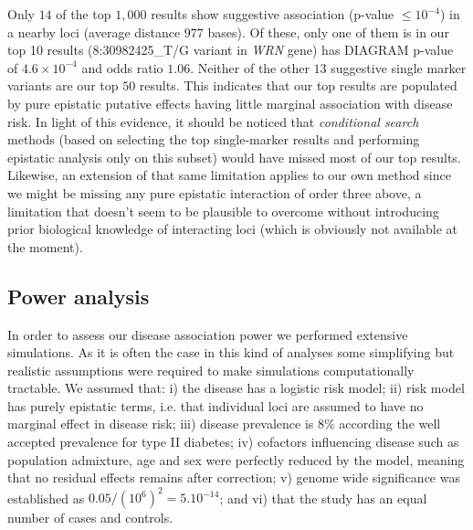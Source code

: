 Only $14$ of the top $1,000$ results show suggestive association (p-value $\le 10^{-4}$) in a nearby loci (average distance $977$ bases).
Of these, only one of them is in our top 10 results (8:30982425\_T/G variant in \textit{WRN} gene) has DIAGRAM p-value of $4.6 \times 10^{-4}$ and odds ratio $1.06$.
Neither of the other $13$ suggestive single marker variants are our top $50$ results.
This indicates that our top results are populated by pure epistatic putative effects having little marginal association with disease risk.
In light of this evidence, it should be noticed that \textit{conditional search} methods (based on selecting the top single-marker results and performing epistatic analysis only on this subset) would have missed most of our top results.
Likewise, an extension of that same limitation applies to our own method since we might be missing any pure epistatic interaction of order three above, a limitation that doesn't seem to be plausible to overcome without introducing prior biological knowledge of interacting loci (which is obviously not available at the moment).


\subsection{Power analysis}

In order to assess our disease association power we performed extensive simulations.
As it is often the case in this kind of analyses some simplifying but realistic assumptions were required to make simulations computationally tractable. 
We assumed that: 
i) the disease has a logistic risk model;
ii) risk model has purely epistatic terms, i.e. that individual loci are assumed to have no marginal effect in disease risk;
iii) disease prevalence is $8\%$ according the well accepted prevalence for type II diabetes;
iv) cofactors influencing disease such as population admixture, age and sex were perfectly reduced by the model, meaning that no residual effects remains after correction;
v) genome wide significance was established as $0.05 / (10^6)^2 = 5 . 10^{-14}$;
and  
vi) that the study has an equal number of cases and controls.

